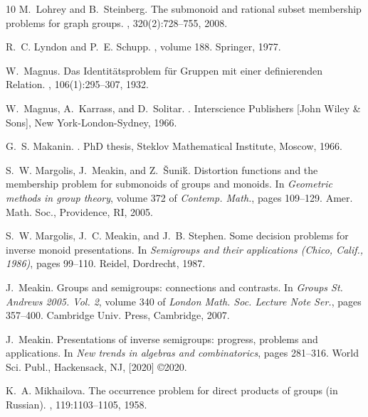 \documentclass{amsart}
\theoremstyle{plain}
\theoremstyle{definition}
\begin{document}
\begin{thebibliography}{10}
M.~Lohrey and B.~Steinberg.
\newblock The submonoid and rational subset membership problems for graph
  groups.
, 320(2):728--755, 2008.

R.~C. Lyndon and P.~E. Schupp.
, volume 188.
\newblock Springer, 1977.

W.~Magnus.
\newblock Das {I}dentit\"{a}tsproblem f\"{u}r {G}ruppen mit einer definierenden
  {R}elation.
, 106(1):295--307, 1932.

W.~Magnus, A.~Karrass, and D.~Solitar.
.
\newblock Interscience Publishers [John Wiley \& Sons], New York-London-Sydney,
  1966.

G.~S. Makanin.
.
\newblock PhD thesis, Steklov Mathematical Institute, Moscow, 1966.

S.~W. Margolis, J.~Meakin, and Z.~\v{S}uni\'{k}.
\newblock Distortion functions and the membership problem for submonoids of
  groups and monoids.
\newblock In {\em Geometric methods in group theory}, volume 372 of {\em
  Contemp. Math.}, pages 109--129. Amer. Math. Soc., Providence, RI, 2005.

S.~W. Margolis, J.~C. Meakin, and J.~B. Stephen.
\newblock Some decision problems for inverse monoid presentations.
\newblock In {\em Semigroups and their applications ({C}hico, {C}alif., 1986)},
  pages 99--110. Reidel, Dordrecht, 1987.

J.~Meakin.
\newblock Groups and semigroups: connections and contrasts.
\newblock In {\em Groups {S}t. {A}ndrews 2005. {V}ol. 2}, volume 340 of {\em
  London Math. Soc. Lecture Note Ser.}, pages 357--400. Cambridge Univ. Press,
  Cambridge, 2007.

J.~Meakin.
\newblock Presentations of inverse semigroups: progress, problems and
  applications.
\newblock In {\em New trends in algebras and combinatorics}, pages 281--316.
  World Sci. Publ., Hackensack, NJ, [2020] \copyright 2020.

K.~A. Mikhailova.
\newblock The occurrence problem for direct products of groups (in Russian).
, 119:1103--1105, 1958.


\end{thebibliography}
\end{document}
